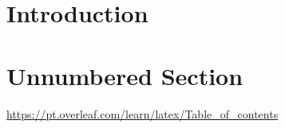 \documentclass[12pt]{article}
\begin{document}
\tableofcontents

\section{Introduction}
  
\section*{Unnumbered Section}

\url{ https://pt.overleaf.com/learn/latex/Table_of_contents}
\end{document}
